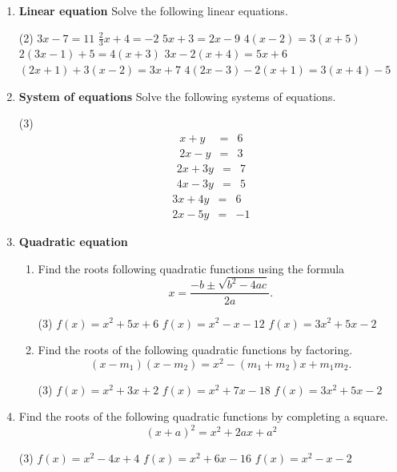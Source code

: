 \begin{enumerate}

\item \textbf{Linear equation} Solve the following linear equations.
\begin{tasks}[after-skip = 60pt, after-item-skip = 60pt](2)
\task $3x - 7 = 11$
\task $\displaystyle \frac{2}{3}x + 4 = -2$
\task $5x + 3 = 2x - 9$
\task $4(x - 2) = 3(x + 5)$
\task $2(3x - 1) + 5 = 4(x + 3)$
\task $3x - 2(x + 4) = 5x + 6$
\task $(2x + 1) + 3(x - 2) = 3x + 7$
\task $4(2x - 3) - 2(x + 1) = 3(x + 4) - 5$
\end{tasks}

\item \textbf{System of equations} Solve the following systems of equations.
\begin{tasks}[after-skip = 100pt](3)
\task
\begin{eqnarray*}
x + y &=& 6\\
2x - y &=& 3
\end{eqnarray*}
\task
\begin{eqnarray*}
2x + 3y &=& 7 \\
4x - 3y &=& 5
\end{eqnarray*}
\task
\begin{eqnarray*}
3x + 4y &=& 6 \\
2x - 5y &=& -1
\end{eqnarray*}
\end{tasks}

\newpage
\item \textbf{Quadratic equation}
\begin{enumerate}
\item Find the roots following quadratic functions using the formula
\[ x =  \frac{-b \pm \sqrt{b^2 - 4ac}}{2a}.\]
\begin{tasks}[after-skip = 100pt](3)
\task $f(x) = x^2 +5x+6$
\task $f(x) = x^2 - x - 12$
\task $f(x) = 3x^2 +5x - 2$
\end{tasks}

\item Find the roots of the following quadratic functions by factoring.
\[(x-m_1)(x-m_2) = x^2 - (m_1+m_2)x + m_1m_2.\]
\begin{tasks}[after-skip = 100pt](3)
\task $f(x) = x^2 +3x+2$
\task $f(x) = x^2 + 7x - 18$
\task $f(x) = 3x^2 +5x - 2$
\end{tasks}
\end{enumerate}

\iffalse
\item Find the roots of the following quadratic functions by completing a square.
\[ (x+a)^2 = x^2 +2ax + a^2\]
\begin{tasks}[after-skip = 50pt](3)
\task $f(x) = x^2 -4x+4$
\task $f(x) = x^2 +6x -16$
\task $f(x) = x^2 - x - 2$
\end{tasks}




\end{enumerate}
